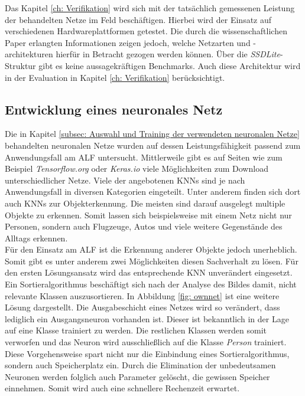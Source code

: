 		Das Kapitel \ref{ch: Verifikation} wird sich mit der tatsächlich gemessenen Leistung der behandelten Netze im Feld beschäftigen. Hierbei wird der Einsatz auf verschiedenen Hardwareplattformen getestet. Die durch die wissenschaftlichen Paper erlangten Informationen zeigen jedoch, welche Netzarten und -architekturen hierfür in Betracht gezogen werden können. Über die \textit{SSDLite}-Struktur gibt es keine aussagekräftigen Benchmarks. Auch diese Architektur wird in der Evaluation in Kapitel \ref{ch: Verifikation} berücksichtigt.
		
		\subsection{Entwicklung eines neuronales Netz}
		\label{subsec: Entwickeltes neuronales Netz}
		
		Die in Kapitel \ref{subsec: Auswahl und Training der verwendeten neuronalen Netze} behandelten neuronalen Netze wurden auf dessen Leistungsfähigkeit passend zum Anwendungsfall am ALF untersucht. Mittlerweile gibt es auf Seiten wie zum Beispiel \textit{Tensorflow.org} oder \textit{Keras.io} viele Möglichkeiten zum Download unterschiedlicher Netze. Viele der angebotenen KNNs sind je nach Anwendungsfall in diversen Kategorien eingeteilt. Unter anderem finden sich dort auch KNNs zur Objekterkennung. Die meisten sind darauf ausgelegt multiple Objekte zu erkennen. Somit lassen sich beispielsweise mit einem Netz nicht nur Personen, sondern auch Flugzeuge, Autos und viele weitere Gegenstände des Alltags erkennen. \\ 
		
		
		
		Für den Einsatz am ALF ist die Erkennung anderer Objekte jedoch unerheblich. Somit gibt es unter anderem zwei Möglichkeiten diesen Sachverhalt zu lösen. Für den ersten Lösungsansatz wird das entsprechende KNN unverändert eingesetzt. Ein Sortieralgorithmus beschäftigt sich nach der Analyse des Bildes damit, nicht relevante Klassen auszusortieren. In Abbildung \ref{fig: ownnet} ist eine weitere Lösung dargestellt. Die Ausgabeschicht eines Netzes wird so verändert, dass lediglich ein Ausgangsneuron vorhanden ist. Dieser ist bekanntlich in der Lage auf eine Klasse trainiert zu werden. Die restlichen Klassen werden somit verworfen und das Neuron wird ausschließlich auf die Klasse \textit{Person} trainiert. Diese Vorgehensweise spart nicht nur die Einbindung eines Sortieralgorithmus, sondern auch Speicherplatz ein. Durch die Elimination der unbedeutsamen Neuronen werden folglich auch Parameter gelöscht, die gewissen Speicher einnehmen. Somit wird auch eine schnellere Rechenzeit erwartet. \\
		

